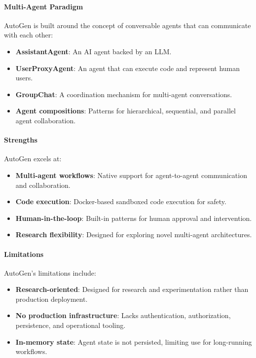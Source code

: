 \documentclass[a4paper,twoside]{sapthesis}
\begin{document}
\paragraph{Multi-Agent Paradigm}
AutoGen is built around the concept of conversable agents that can communicate with each other:
\begin{itemize}
    \item \textbf{AssistantAgent}: An AI agent backed by an LLM.
    \item \textbf{UserProxyAgent}: An agent that can execute code and represent human users.
    \item \textbf{GroupChat}: A coordination mechanism for multi-agent conversations.
    \item \textbf{Agent compositions}: Patterns for hierarchical, sequential, and parallel agent collaboration.
\end{itemize}

\paragraph{Strengths}
AutoGen excels at:
\begin{itemize}
    \item \textbf{Multi-agent workflows}: Native support for agent-to-agent communication and collaboration.
    \item \textbf{Code execution}: Docker-based sandboxed code execution for safety.
    \item \textbf{Human-in-the-loop}: Built-in patterns for human approval and intervention.
    \item \textbf{Research flexibility}: Designed for exploring novel multi-agent architectures.
\end{itemize}

\paragraph{Limitations}
AutoGen's limitations include:
\begin{itemize}
    \item \textbf{Research-oriented}: Designed for research and experimentation rather than production deployment.
    \item \textbf{No production infrastructure}: Lacks authentication, authorization, persistence, and operational tooling.
    \item \textbf{In-memory state}: Agent state is not persisted, limiting use for long-running workflows.
\end{itemize}
\end{document}

